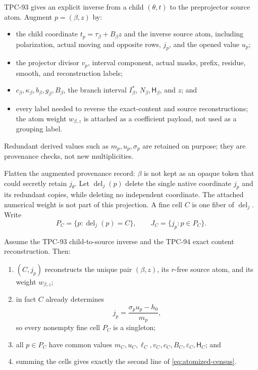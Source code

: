 TPC-93 gives an explicit inverse from a child \((\theta,t)\) to the
preprojector source atom.  Augment \(p=(\beta,z)\) by:
\begin{itemize}[leftmargin=2em]
\item the child coordinate
  \(t_p=\tau_\beta+B_\beta z\) and the inverse source atom, including
  polarization, actual moving and opposite rows, \(j_p\), and the
  opened value \(u_p\);
\item the projector divisor \(v_p\), interval component, actual
  masks, prefix, residue, smooth, and reconstruction labels;
\item \(c_\beta,\kappa_\beta,b_\beta,g_\beta,B_\beta\), the branch
  interval \(I_\beta^\ast\), \(N_\beta,\mathsf H_\beta\), and \(z\); and
\item every label needed to reverse the exact-content and source
  reconstructions; the atom weight \(w_{\beta,z}\) is attached as a
  coefficient payload, not used as a grouping label.
\end{itemize}
Redundant derived values such as \(m_p,u_p,\sigma_p\) are retained
on purpose; they are provenance checks, not new multiplicities.

\begin{definition}
\label{def:fine-cell}
Flatten the augmented provenance record: \(\beta\) is not kept as an
opaque token that could secretly retain \(j_\theta\).  Let
\(\operatorname{del}_j(p)\) delete the single native coordinate
\(j_p\) and its redundant copies, while deleting no independent
coordinate.  The attached numerical weight is not part of this
projection.  A fine cell \(C\) is one fiber of
\(\operatorname{del}_j\).  Write
\[
 P_C=\{p:\operatorname{del}_j(p)=C\},\qquad
 J_C=\{j_p:p\in P_C\}.
\]
\end{definition}

\begin{theorem}
\label{thm:lossless-atom-cells}
Assume the TPC-93 child-to-source inverse and the TPC-94 exact
content reconstruction.  Then:
\begin{enumerate}[label=(\roman*),leftmargin=2.2em]
\item \((C,j_p)\) reconstructs the unique pair \((\beta,z)\), its
  \(r\)-free source atom, and its weight \(w_{\beta,z}\);
\item in fact \(C\) already determines
  \[
   j_p=\frac{\sigma_pu_p-h_0}{m_p},
  \]
  so every nonempty fine cell \(P_C\) is a singleton;
\item all \(p\in P_C\) have common values
  \(m_C,u_C,\ell_C,v_C,c_C,B_C,\varepsilon_C,\mathsf H_C\); and
\item summing the cells gives exactly the second line of
  \eqref{eq:atomized-census}.
\end{enumerate}
\end{theorem}

